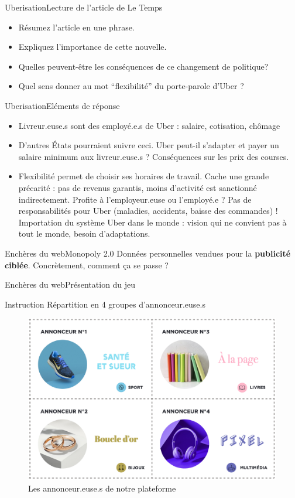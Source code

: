 \documentclass{beamer}
\begin{document}
\begin{frame}{Uberisation}{Lecture de l'article de Le Temps}
	\begin{itemize}
		\item Résumez l’article en une phrase.
		\item Expliquez l’importance de cette nouvelle.
		\item Quelles peuvent-être les conséquences de ce changement de politique?
		\item Quel sens donner au mot ``flexibilité'' du porte-parole d’Uber ?
	\end{itemize}
\end{frame}

\begin{frame}{Uberisation}{Eléments de réponse}
	\begin{itemize}
		\item<1-> Livreur.euse.s sont des employé.e.s de Uber : salaire, cotisation, chômage
		\item<2-> D'autres États pourraient suivre ceci. Uber peut-il s'adapter et payer un salaire minimum aux livreur.euse.s ? Conséquences sur les prix des courses.
		\item<3-> Flexibilité permet de choisir ses horaires de travail. Cache une grande précarité : pas de revenus garantis, moins d'activité est sanctionné indirectement. Profite à l'employeur.euse ou l'employé.e ? Pas de responsabilités pour Uber (maladies, accidents, baisse des commandes) ! Importation du système Uber dans le monde : vision qui ne convient pas à tout le monde, besoin d'adaptations.
	\end{itemize}
\end{frame}


\begin{frame}{Enchères du web}{Monopoly 2.0}
	Données personnelles vendues pour la \textbf{publicité ciblée}. Concrètement, comment ça se passe ?
\end{frame}

\begin{frame}{Enchères du web}{Présentation du jeu}
	\begin{exampleblock}{Instruction}
		Répartition en 4 groupes d'annonceur.euse.s
	\end{exampleblock}
	\begin{figure}
		\includegraphics[width=0.5\linewidth]{annonceurs.png}
		\caption{Les annonceur.euse.s de notre plateforme}
	\end{figure}
\end{frame}
\end{document}
